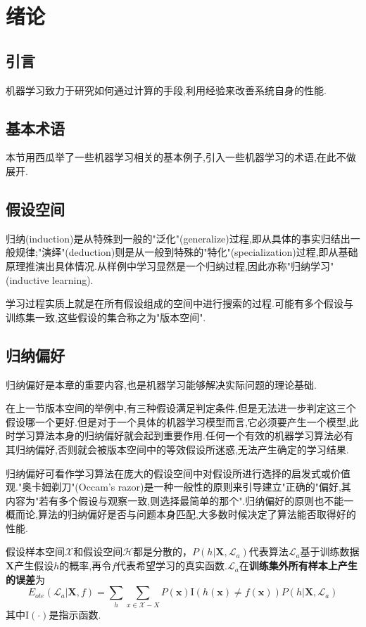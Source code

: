 \chapter{绪论}

\section{引言}

机器学习致力于研究如何通过计算的手段,利用经验来改善系统自身的性能.

\section{基本术语}

本节用西瓜举了一些机器学习相关的基本例子,引入一些机器学习的术语,在此不做展开.

\section{假设空间}

归纳(induction)是从特殊到一般的"泛化"(generalize)过程,即从具体的事实归结出一般规律;"演绎"(deduction)则是从一般到特殊的"特化"(specialization)过程,即从基础原理推演出具体情况.从样例中学习显然是一个归纳过程,因此亦称"归纳学习"(inductive learning).

学习过程实质上就是在所有假设组成的空间中进行搜索的过程.可能有多个假设与训练集一致,这些假设的集合称之为"版本空间".

\section{归纳偏好}

归纳偏好是本章的重要内容,也是机器学习能够解决实际问题的理论基础.

在上一节版本空间的举例中,有三种假设满足判定条件,但是无法进一步判定这三个假设哪一个更好.但是对于一个具体的机器学习模型而言,它必须要产生一个模型,此时学习算法本身的归纳偏好就会起到重要作用.任何一个有效的机器学习算法必有其归纳偏好,否则就会被版本空间中的等效假设所迷惑,无法产生确定的学习结果.

归纳偏好可看作学习算法在庞大的假设空间中对假设所进行选择的启发式或价值观."奥卡姆剃刀"(Occam's razor)是一种一般性的原则来引导建立"正确的"偏好,其内容为"若有多个假设与观察一致,则选择最简单的那个".归纳偏好的原则也不能一概而论,算法的归纳偏好是否与问题本身匹配,大多数时候决定了算法能否取得好的性能.

假设样本空间$\mathcal X$和假设空间$\mathcal H$都是分散的，$P(h|\mathbf X,\mathcal L_a)$代表算法$\mathcal L_a$基于训练数据$\mathbf X$产生假设$h$的概率,再令$f$代表希望学习的真实函数.$\mathcal L_a$在\textbf{训练集外所有样本上产生的误差}为
\begin{equation}
E_{ote}(\mathcal L_a|\mathbf X, f)=\sum_h\sum_{x\in\mathcal X - X}P(\mathbf x)\text{I}(h(\mathbf x)\ne f(\mathbf x))P(h|\mathbf X,\mathcal L_a)
\end{equation}
其中$\text{I}(\cdot)$是指示函数.

